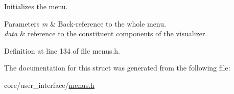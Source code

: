 Initializes the menu. 


\begin{DoxyParams}{Parameters}
{\em m} & Back-\/reference to the whole menu. \\
\hline
{\em data} & reference to the constituent components of the visualizer. \\
\hline
\end{DoxyParams}


Definition at line 134 of file menus.\+h.



The documentation for this struct was generated from the following file\+:\begin{DoxyCompactItemize}
\item 
core/user\+\_\+interface/\hyperlink{menus_8h}{menus.\+h}\end{DoxyCompactItemize}
